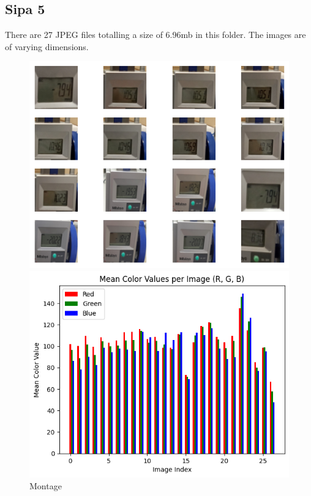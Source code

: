

\subsection{Sipa 5}

There are 27 JPEG files totalling a size of 6.96mb in this folder. The images are of varying dimensions.

\begin{figure}[ht]
    \centering
    \begin{minipage}[t]{0.25\textwidth}
        \centering
        \includegraphics[width=\textwidth]{Figures/EDA_Charts/5/montage.png}
        \caption*{Montage}
    \end{minipage}\hfill
    \begin{minipage}[t]{0.25\textwidth}
        \centering
        \includegraphics[width=\textwidth]{Figures/EDA_Charts/5/rgb.png}

\end{minipage}
\end{figure}
